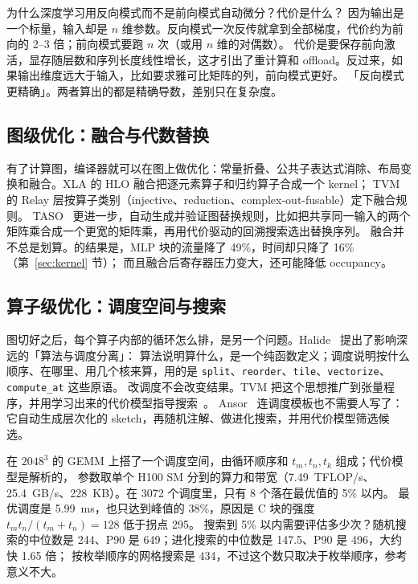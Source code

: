 \begin{qa}{为什么深度学习用反向模式而不是前向模式自动微分？代价是什么？}
\ans 因为输出是一个标量，输入却是 $n$ 维参数。反向模式一次反传就拿到全部梯度，代价约为前向的 2--3 倍；前向模式要跑 $n$ 次（或用 $n$ 维的对偶数）。
代价是要保存前向激活，显存随层数和序列长度线性增长，这才引出了重计算和 offload。反过来，如果输出维度远大于输入，比如要求雅可比矩阵的列，前向模式更好。
\wrong 「反向模式更精确」。两者算出的都是精确导数，差别只在复杂度。
\end{qa}

\subsection{图级优化：融合与代数替换}

有了计算图，编译器就可以在图上做优化：常量折叠、公共子表达式消除、布局变换和融合。XLA 的 HLO 融合把逐元素算子和归约算子合成一个 kernel；
TVM~\cite{chen2018tvm} 的 Relay 层按算子类别（injective、reduction、complex-out-fusable）定下融合规则。
TASO~\cite{jia2019taso} 更进一步，自动生成并验证图替换规则，比如把共享同一输入的两个矩阵乘合成一个更宽的矩阵乘，再用代价驱动的回溯搜索选出替换序列。
融合并不总是划算。的结果是，MLP 块的流量降了 49\%，时间却只降了 16\%（第~\ref{sec:kernel} 节）；
而且融合后寄存器压力变大，还可能降低 occupancy。

\subsection{算子级优化：调度空间与搜索}

图切好之后，每个算子内部的循环怎么排，是另一个问题。Halide~\cite{ragan2013halide} 提出了影响深远的「算法与调度分离」：
算法说明算什么，是一个纯函数定义；调度说明按什么顺序、在哪里、用几个核来算，用的是 \texttt{split}、\texttt{reorder}、\texttt{tile}、\texttt{vectorize}、\texttt{compute\_at} 这些原语。
改调度不会改变结果。TVM 把这个思想推广到张量程序，并用学习出来的代价模型指导搜索~\cite{chen2018tvm}。
Ansor~\cite{zheng2020ansor} 连调度模板也不需要人写了：它自动生成层次化的 sketch，再随机注解、做进化搜索，并用代价模型筛选候选。

在 $2048^3$ 的 GEMM 上搭了一个调度空间，由循环顺序和 $t_m,t_n,t_k$ 组成；代价模型是解析的，
参数取单个 H100 SM 分到的算力和带宽（7.49~TFLOP/s、25.4~GB/s、228~KB）。在 3072 个调度里，只有 8 个落在最优值的 5\% 以内。
最优调度是 5.99~ms，也只达到峰值的 38\%，原因是 C 块的强度 $t_mt_n/(t_m+t_n)=128$ 低于拐点 295。
搜索到 5\% 以内需要评估多少次？随机搜索的中位数是 244、P90 是 649；进化搜索的中位数是 147.5、P90 是 496，大约快 1.65 倍；
按枚举顺序的网格搜索是 434，不过这个数只取决于枚举顺序，参考意义不大。

